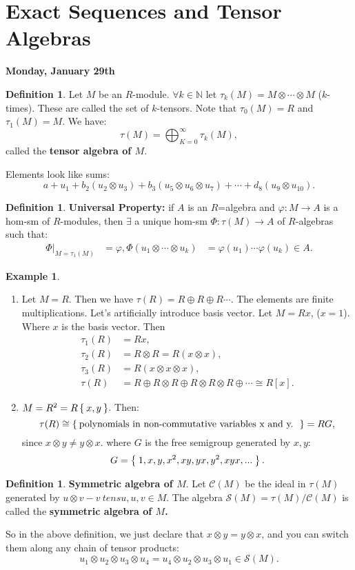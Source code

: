 \documentclass[12pt]{amsbook}
\theoremstyle{plain}
\numberwithin{section}{chapter}
\numberwithin{equation}{chapter}
\theoremstyle{definition}
\newtheorem{Def}[theorem]{Definition}
\newtheorem{Ex}[theorem]{Example}
\theoremstyle{remark}
\newcommand{\n}{\mathbb{N}}
\newcommand{\bee}{\begin{equation}\begin{aligned}}
\newcommand{\eee}{\end{aligned}\end{equation}}
\newcommand{\tens}{\otimes}
\renewcommand{\phi}{\varphi}
\begin{document}
\section{Exact Sequences and Tensor Algebras}

\textbf{Monday, January 29th}

\begin{Def}
Let $M$ be an $R$-module. $\forall k \in \n$ let $\tau_k(M) = M \tens \cdots \tens M$ ($k$-times). These are called the set of $k$-tensors. Note that $\tau_0(M) = R$ and $\tau_1(M) = M$. We have:
$$
\tau(M) = \bigoplus_{K = 0}^\infty \tau_k(M),
$$
called the \textbf{tensor algebra of $M$}. 
\end{Def}

Elements look like sums:
$$
a + u_1 + b_2(u_2 \tens u_3) + b_3(u_5 \tens u_6 \tens u_7) + \cdots + d_8(u_9 \tens u_{10}).
$$

\begin{Def}
\textbf{Universal Property: }if $A$ is an $R$=algebra and $\phi: M \to A$ is a hom-sm of $R$-modules, then $\exists$ a unique hom-sm $\Phi:\tau(M) \to A$ of $R$-algebras such that:
\bee
\Phi|_{M = \tau_1(M)} &= \phi,
\Phi(u_1 \tens \cdots \tens u_k) &= \phi(u_1) \cdots \phi(u_k) \in A.
\eee
\end{Def}

\begin{Ex}
\begin{enumerate}
\item Let $M = R$. Then we have $\tau(R) = R \oplus R \oplus R \cdots$. The elements are finite multiplications. Let's artificially introduce basis vector. Let $M = Rx$, ($x = 1$). Where $x$ is the basis vector. Then 
\bee 
\tau_1(R) &= Rx,\\
\tau_2(R) &= R \tens R = R(x \tens x),\\
\tau_3(R) &= R(x \tens x \tens x),\\
\tau(R) &= R \oplus R \tens R \oplus R \tens R \tens R \oplus \cdots \cong R[x].
\eee

\item $M = R^2 = R\Set{x,y}$. Then:
$$
\tau(R) \cong \Set{\text{polynomials in non-commutative variables x and y. }} = RG,
$$
since $x \tens y \neq y \tens x$. where $G$ is the free semigroup generated by $x,y$:
$$
G = \Set{1,x,y,x^2,xy,yx,y^2,xyx,...}.
$$
\end{enumerate}
\end{Ex}

\begin{Def}
\textbf{Symmetric algebra of $M$}. Let $\mathcal{C}(M)$ be the ideal in $\tau(M)$ generated by $u \tens v - v\ tens u, u,v \in M$. The algebra $\mathcal{S}(M) = \tau(M)/\mathcal{C}(M)$ is called the \textbf{symmetric algebra of $M$.}
\end{Def}
So in the above definition, we just declare that $x \tens y = y \tens x$, and you can switch them along any chain of tensor products:
$$
u_1 \tens u_2 \tens u_3 \tens u_4 = u_4 \tens u_2 \tens u_3 \tens u_1 \in \mathcal{S}(M).
$$
\end{document}
